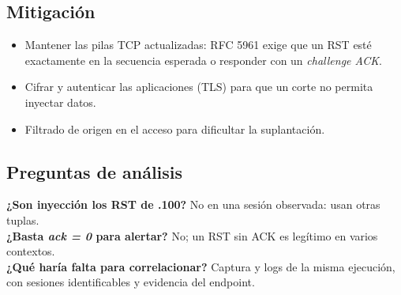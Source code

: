 \subsection{Mitigación}
\begin{itemize}
\item Mantener las pilas TCP actualizadas: RFC 5961 \cite{rfc5961} exige que un RST esté exactamente en la secuencia esperada o responder con un \emph{challenge ACK}.
\item Cifrar y autenticar las aplicaciones (TLS) para que un corte no permita inyectar datos.
\item Filtrado de origen en el acceso para dificultar la suplantación.
\end{itemize}

\subsection{Preguntas de análisis}
\textbf{¿Son inyección los RST de .100?} No en una sesión observada: usan otras tuplas.\\
\textbf{¿Basta \emph{ack = 0} para alertar?} No; un RST sin ACK es legítimo en varios contextos.\\
\textbf{¿Qué haría falta para correlacionar?} Captura y logs de la misma ejecución, con sesiones identificables y evidencia del endpoint.
